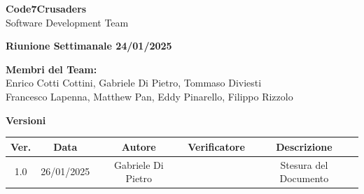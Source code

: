 \documentclass{article}
\begin{document}
\begin{titlepage}
    {\Huge \textbf{Code7Crusaders}}\\
    \vspace{0.5cm}
    {\Large Software Development Team}\\
    \vspace{2cm}
        
        {\large \textbf{Riunione Settimanale 24/01/2025}}\\
    \vspace{5cm}                           %
    
    
    \textbf{Membri del Team:}\\
    Enrico Cotti Cottini, Gabriele Di Pietro, Tommaso Diviesti \\
    Francesco Lapenna, Matthew Pan, Eddy Pinarello, Filippo Rizzolo \\
    \vspace{0.5cm}
    
    \vspace{1cm}
\end{titlepage}



\newpage
\begin{table}[h!]
\centering
\textbf{Versioni} \\ %
\vspace{2mm} %
\begin{tabular}{|c|c|c|c|c|}
    \hline
    \textbf{Ver.} & \textbf{Data} & \textbf{Autore} & \textbf{Verificatore} & \textbf{Descrizione} \\
    \hline
    1.0 & 26/01/2025 & Gabriele Di Pietro &  & Stesura del Documento \\ 
    \hline                                  %
\end{tabular}
\end{table}



\newpage
\end{document}
